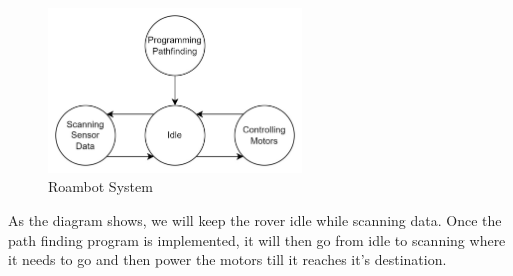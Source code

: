 \begin{figure}[h!]
	\centering
   	\includegraphics[width=0.6\textwidth]{images/roambot_system.jpg} %
        \caption{Roambot System} %
\end{figure}
As the diagram shows, we will keep the rover idle while scanning data. Once the path finding program is implemented, it will then go from idle to scanning where it needs to go and then power the motors till it reaches it's destination.